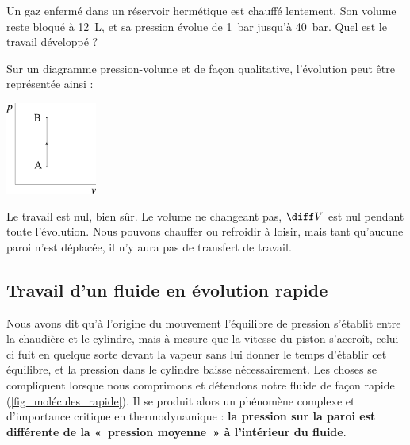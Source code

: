 			\begin{anexample}
				Un gaz enfermé dans un réservoir hermétique est chauffé lentement. Son volume reste bloqué à \SI{12}{\liter}, et sa pression évolue de \SI{1}{\bar} jusqu’à \SI{40}{\bar}. Quel est le travail développé ?
					\begin{answer}
						Sur un diagramme pression-volume et de façon qualitative, l’évolution peut être représentée ainsi :
							\begin{center}
								\includegraphics[width=3cm]{images/ex_pv_isochore.png}
							\end{center}
						Le travail est nul, bien sûr. Le volume ne changeant pas, $\diff V$ est nul pendant toute l’évolution. Nous pouvons chauffer ou refroidir à loisir, mais tant qu’aucune paroi n’est déplacée, il n’y aura pas de transfert de travail.
					\end{answer}
			\end{anexample}
			

	\subsection{Travail d’un fluide en évolution rapide}
	\label{ch_évolutions_irr_sf}

			Nous avons dit qu’à l’origine du mouvement l’équilibre de pression s’établit entre la chaudière et le cylindre, mais à mesure que la vitesse du piston s’accroît, celui-ci fuit en quelque sorte devant la vapeur sans lui donner le temps d’établir cet équilibre, et la pression dans le cylindre baisse \mbox{nécessairement}.
		Les choses se compliquent lorsque nous comprimons et détendons notre fluide de façon rapide (\cref{fig_molécules_rapide}). Il se produit alors un phénomène complexe et d’importance critique en thermodynamique : \textbf{la pression sur la paroi est différente de la «~pression moyenne~» à l’intérieur du fluide}.

